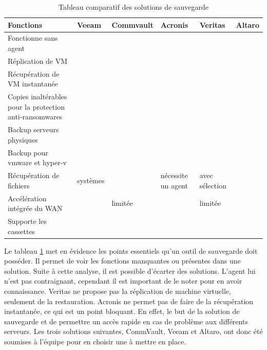 \documentclass[pfe]{tnreport} %
\newcommand{\cmark}{\ding{51}}%
\newcommand{\xmark}{\ding{55}}%
\begin{document}
\begin{table}[!h]
 \centering
 \begin{tabular}{|p{5cm}|p{1.5cm}|p{2cm}|p{1.5cm}|p{1.5cm}|p{1.5cm}|}
 \hline Fonctions & Veeam & Commvault & Acronis & Veritas & Altaro\\
 \hline Fonctionne sans agent & \cmark & \cmark & \cmark & \xmark & \xmark \\
 \hline Réplication de VM & \cmark & \cmark & \cmark & \xmark & \cmark \\
 \hline Récupération de VM instantanée & \cmark & \xmark & \xmark & \cmark & \cmark \\
 \hline Copies inaltérables
 pour la protection anti-ransomwares & \cmark & \xmark & \cmark & \cmark & \cmark \\
 \hline Backup serveurs physiques & \cmark & \cmark & \cmark & \cmark & \cmark \\
 \hline Backup pour vmware et hyper-v & \cmark & \cmark & \cmark & \xmark & \cmark \\
 \hline Récupération de fichiers & systèmes & \cmark & nécessite un agent & avec sélection & \cmark \\
 \hline Accélération intégrée du WAN & \cmark & limitée & \xmark & limitée & \cmark \\
 \hline Supporte les cassettes & \cmark & \xmark & \xmark & \cmark & \xmark \\
 \hline 
 \end{tabular}
 \caption{Tableau comparatif des solutions de sauvegarde}
 \label{tab:comparatif_solution}
\end{table}
Le tableau \ref{tab:comparatif_solution} met en évidence les points essentiels qu'un outil de sauvegarde doit posséder. Il permet de voir les fonctions manquantes ou présentes dans une solution. \newline
Suite à cette analyse, il est possible d'écarter des solutions. L'agent lui n'est pas contraignant, cependant il est important de le noter pour en avoir connaissance. \newline
Veritas ne propose pas la réplication de machine virtuelle, seulement de la restauration. \newline
Acronis ne permet pas de faire de la récupération instantanée, ce qui est un point bloquant. \newline 
En effet, le but de la solution de sauvegarde et de permettre un accès rapide en cas de problème aux différents serveurs. \newline
Les trois solutions suivantes, CommVault, Veeam et Altaro, ont donc été soumises à l'équipe pour en choisir une à mettre en place. \newline
\end{document}
